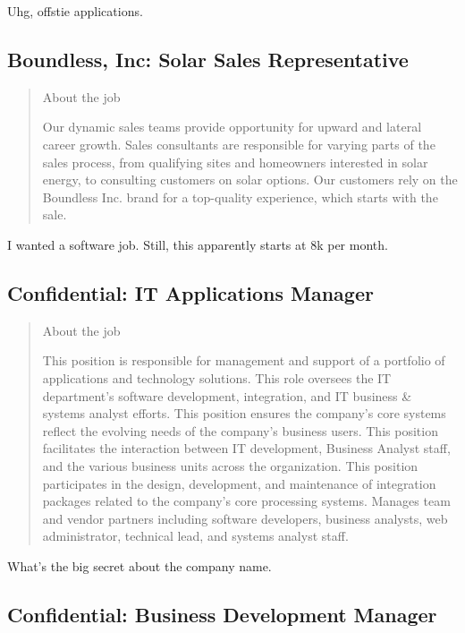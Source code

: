 \documentclass[
	letterpaper, %
	12pt, %
]{CSSullivanBusinessReport}
\begin{document}
Uhg, offstie applications. 


\subsection[Boundless, Inc]{Boundless, Inc: Solar Sales Representative}

\begin{quote}
	About the job
	
	Our dynamic sales teams provide opportunity for upward and lateral career growth. Sales consultants are responsible for varying parts of the sales process, from qualifying sites and homeowners interested in solar energy, to consulting customers on solar options. Our customers rely on the Boundless Inc. brand for a top-quality experience, which starts with the sale.

\end{quote}

I wanted a software job. Still, this apparently starts at 8k per month. 


\subsection[Confidential]{Confidential: IT Applications Manager}

\begin{quote}
	About the job
	
	This position is responsible for management and support of a portfolio of applications and technology solutions. This role oversees the IT department's software development, integration, and IT business \& systems analyst efforts. This position ensures the company's core systems reflect the evolving needs of the company's business users. This position facilitates the interaction between IT development, Business Analyst staff, and the various business units across the organization. This position participates in the design, development, and maintenance of integration packages related to the company's core processing systems. Manages team and vendor partners including software developers, business analysts, web administrator, technical lead, and systems analyst staff.

\end{quote}

What's the big secret about the company name. 


\subsection[Confidential]{Confidential: Business Development Manager}
\end{document}
